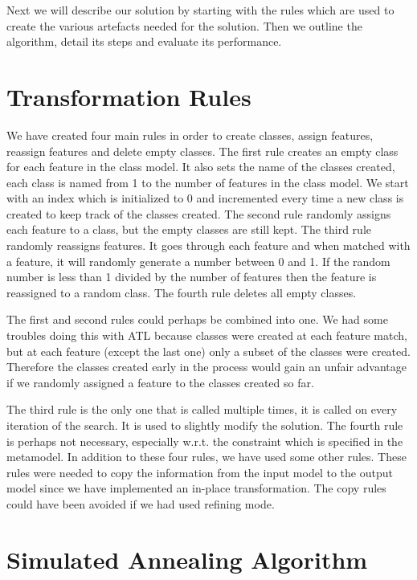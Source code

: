 \documentclass[a4paper]{article}
\begin{document}
Next we will describe our solution by starting with the rules which are used to create the various artefacts needed for the solution.
Then we outline the algorithm, detail its steps and evaluate its performance.


\section{Transformation Rules}\label{sec:rules}

We have created four main rules in order to create classes, assign features, reassign features and delete empty classes.
The first rule creates an empty class for each feature in the class model.
It also sets the name of the classes created, each class is named from 1 to the number of features in the class model.
We start with an index which is initialized to 0 and incremented every time a new class is created to keep track of the classes created.
The second rule randomly assigns each feature to a class, but the empty classes are still kept.
The third rule randomly reassigns features.
It goes through each feature and when matched with a feature, it will randomly generate a number between 0 and 1.
If the random number is less than 1 divided by the number of features then the feature is reassigned to a random class.
The fourth rule deletes all empty classes.

The first and second rules could perhaps be combined into one.
We had some troubles doing this with ATL because classes were created at each feature match, but at each feature (except the last one) only a subset of the classes were created. 
Therefore the classes created early in the process would gain an unfair advantage if we randomly assigned a feature to the classes created so far.

The third rule is the only one that is called multiple times, it is called on every iteration of the search.
It is used to slightly modify the solution.
The fourth rule is perhaps not necessary, especially w.r.t. the constraint which is specified in the metamodel.
In addition to these four rules, we have used some other rules.
These rules were needed to copy the information from the input model to the output model since we have implemented an in-place transformation.
The copy rules could have been avoided if we had used refining mode.

\section{Simulated Annealing Algorithm}
\end{document}
